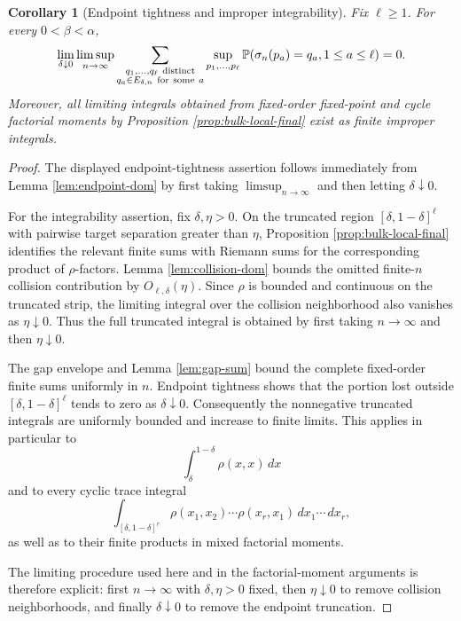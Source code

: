 \documentclass[11pt]{article}
\newtheorem{corollary}[theorem]{Corollary}
\theoremstyle{remark}
\newcommand{\Pp}{\mathbb P}
\newcommand{\dd}{\,d}
\begin{document}
\begin{corollary}[Endpoint tightness and improper integrability]
\label{cor:endpoint-tightness}
Fix $\ell\ge1$.  For every $0<\beta<\alpha$,
\[
\lim_{\delta\downarrow0}\limsup_{n\to\infty}
\sum_{\substack{q_1,\ldots,q_\ell\ {\rm distinct}\\
q_a\in E_{\delta,n}\ {\rm for\ some}\ a}}
\sup_{p_1,\ldots,p_\ell}
\Pp(\sigma_n(p_a)=q_a,1\le a\le\ell)=0.
\]
Moreover, all limiting integrals obtained from fixed-order fixed-point and
cycle factorial moments by Proposition \ref{prop:bulk-local-final} exist as
finite improper integrals.
\end{corollary}

\begin{proof}
The displayed endpoint-tightness assertion follows immediately from Lemma
\ref{lem:endpoint-dom} by first taking $\limsup_{n\to\infty}$ and then
letting $\delta\downarrow0$.

For the integrability assertion, fix $\delta,\eta>0$.  On the truncated region
$[\delta,1-\delta]^\ell$ with pairwise target separation greater than $\eta$,
Proposition \ref{prop:bulk-local-final} identifies the relevant finite sums
with Riemann sums for the corresponding product of $\rho$-factors.  Lemma
\ref{lem:collision-dom} bounds the omitted finite-$n$ collision contribution by
$O_{\ell,\delta}(\eta)$.  Since $\rho$ is bounded and continuous on the
truncated strip, the limiting integral over the collision neighborhood also
vanishes as $\eta\downarrow0$.  Thus the full truncated integral is obtained by
first taking $n\to\infty$ and then $\eta\downarrow0$.

The gap envelope and Lemma \ref{lem:gap-sum} bound the complete fixed-order
finite sums uniformly in $n$.  Endpoint tightness shows that the portion lost
outside $[\delta,1-\delta]^\ell$ tends to zero as $\delta\downarrow0$.
Consequently the nonnegative truncated integrals are uniformly bounded and
increase to finite limits.  This applies in particular to
\[
 \int_\delta^{1-\delta}\rho(x,x)\dd x
\]
and to every cyclic trace integral
\[
 \int_{[\delta,1-\delta]^r}
 \rho(x_1,x_2)\cdots\rho(x_r,x_1)
 \dd x_1\cdots\dd x_r,
\]
as well as to their finite products in mixed factorial moments.

The limiting procedure used here and in the factorial-moment arguments is
therefore explicit: first \(n\to\infty\) with \(\delta,\eta>0\) fixed, then
\(\eta\downarrow0\) to remove collision neighborhoods, and finally
\(\delta\downarrow0\) to remove the endpoint truncation.
\end{proof}
\end{document}
